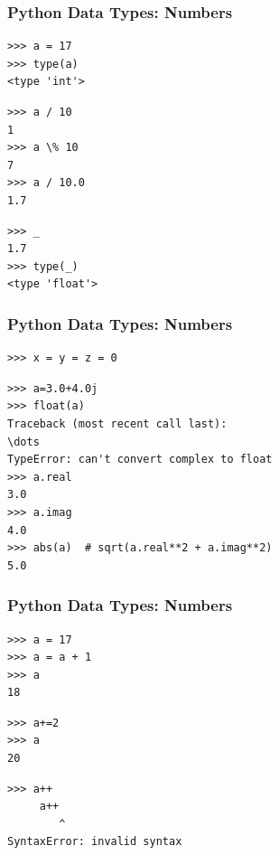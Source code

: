 \documentclass[t,10pt,compress=false,usepdftitle=false]{beamer}
\begin{document}
\begin{frame}[fragile]
    \frametitle{Python Data Types: Numbers}
    \begin{myColorBox}{0.9}{}
\begin{verbatim}
>>> a = 17
>>> type(a)
<type 'int'>
\end{verbatim}
    \end{myColorBox}
    \pause
    \begin{myColorBox}{0.9}{}
\begin{verbatim}
>>> a / 10
1
>>> a \% 10
7
>>> a / 10.0
1.7
\end{verbatim}
    \end{myColorBox}
    \pause
    \begin{myColorBox}{0.9}{}
\begin{verbatim}
>>> _
1.7
>>> type(_)
<type 'float'>
\end{verbatim}
    \end{myColorBox}
\end{frame}


\begin{frame}[fragile]
    \frametitle{Python Data Types: Numbers}
    \begin{myColorBox}{0.91}{}
\begin{verbatim}
>>> x = y = z = 0
\end{verbatim}
    \end{myColorBox}
    \pause
    \begin{myColorBox}{0.91}{}
\begin{verbatim}
>>> a=3.0+4.0j
>>> float(a)
Traceback (most recent call last):
\dots
TypeError: can't convert complex to float
>>> a.real
3.0
>>> a.imag
4.0
>>> abs(a)  # sqrt(a.real**2 + a.imag**2)
5.0
\end{verbatim}
    \end{myColorBox}
\end{frame}


\begin{frame}[fragile]
    \frametitle{Python Data Types: Numbers}
    \begin{myColorBox}{0.9}{}
\begin{verbatim}
>>> a = 17
>>> a = a + 1
>>> a
18
\end{verbatim}
    \end{myColorBox}
    \pause
    \begin{myColorBox}{0.9}{}
\begin{verbatim}
>>> a+=2
>>> a
20
\end{verbatim}
    \end{myColorBox}
    \pause
    \begin{myColorBox}{0.9}{}
\begin{verbatim}
>>> a++
     a++
        ^
SyntaxError: invalid syntax
\end{verbatim}
    \end{myColorBox}
\end{frame}
\end{document}
